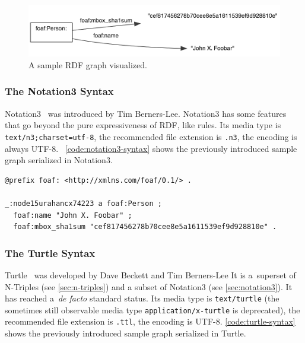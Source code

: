 \begin{figure}[htbp!]
\begin{center}
 \includegraphics[width=\linewidth]{sample-rdf-graph.png} 
 \caption{A sample RDF graph visualized.}
 \label{fig:sample-rdf-graph}
 \end{center}  
\end{figure}

\subsubsection{The Notation3 Syntax} \label{sec:notation3}
Notation3~\cite{BernersLee2011} was introduced by Tim Berners-Lee.
Notation3 has some features that go beyond the pure expressiveness of RDF, like rules.
Its media type is \texttt{text/n3;\-charset=utf-8},
the recommended file extension is \texttt{.n3}, the encoding is always UTF-8.
~\autoref{code:notation3-syntax} shows the previously introduced sample graph serialized in Notation3.

\begin{lstlisting}[caption={A sample graph in Notation3 syntax.},label={code:notation3-syntax}]
@prefix foaf: <http://xmlns.com/foaf/0.1/> .

_:node15urahancx74223 a foaf:Person ;
  foaf:name "John X. Foobar" ;
  foaf:mbox_sha1sum "cef817456278b70cee8e5a1611539ef9d928810e" .
\end{lstlisting}

\subsubsection{The Turtle Syntax} \label{sec:turtle}
Turtle~\cite{Prudhommeaux2011} was developed by Dave Beckett and Tim Berners-Lee
It is a~superset of N-Triples (see \autoref{sec:n-triples}) and
a subset of Notation3 (see \autoref{sec:notation3}).
It has reached a~\emph{de facto} standard status.
Its media type is \texttt{text/turtle}
(the sometimes still observable media type \texttt{application/x-turtle} is deprecated),
the recommended file extension is \texttt{.ttl}, the encoding is UTF-8.
\autoref{code:turtle-syntax} shows the previously introduced sample graph serialized in Turtle.

